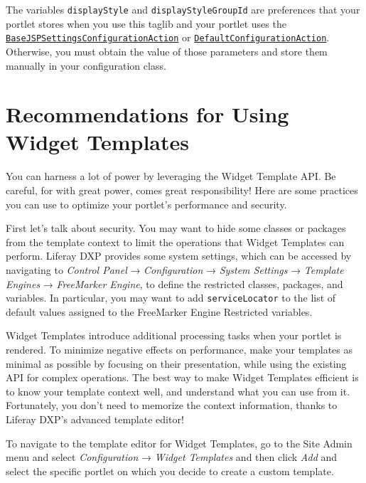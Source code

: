 The variables \texttt{displayStyle} and \texttt{displayStyleGroupId} are
preferences that your portlet stores when you use this taglib and your
portlet uses the
\href{https://docs.liferay.com/dxp/portal/7.2-latest/javadocs/portal-kernel/com/liferay/portal/kernel/portlet/BaseJSPSettingsConfigurationAction.html}{\texttt{BaseJSPSettingsConfigurationAction}}
or
\href{https://docs.liferay.com/dxp/portal/7.2-latest/javadocs/portal-kernel/com/liferay/portal/kernel/portlet/DefaultConfigurationAction.html}{\texttt{DefaultConfigurationAction}}.
Otherwise, you must obtain the value of those parameters and store them
manually in your configuration class.

\section{Recommendations for Using Widget
Templates}\label{recommendations-for-using-widget-templates}

You can harness a lot of power by leveraging the Widget Template API. Be
careful, for with great power, comes great responsibility! Here are some
practices you can use to optimize your portlet's performance and
security.

First let's talk about security. You may want to hide some classes or
packages from the template context to limit the operations that Widget
Templates can perform. Liferay DXP provides some system settings, which
can be accessed by navigating to \emph{Control Panel} →
\emph{Configuration} → \emph{System Settings} → \emph{Template Engines}
→ \emph{FreeMarker Engine}, to define the restricted classes, packages,
and variables. In particular, you may want to add
\texttt{serviceLocator} to the list of default values assigned to the
FreeMarker Engine Restricted variables.

Widget Templates introduce additional processing tasks when your portlet
is rendered. To minimize negative effects on performance, make your
templates as minimal as possible by focusing on their presentation,
while using the existing API for complex operations. The best way to
make Widget Templates efficient is to know your template context well,
and understand what you can use from it. Fortunately, you don't need to
memorize the context information, thanks to Liferay DXP's advanced
template editor!

To navigate to the template editor for Widget Templates, go to the Site
Admin menu and select \emph{Configuration} → \emph{Widget Templates} and
then click \emph{Add} and select the specific portlet on which you
decide to create a custom template.

